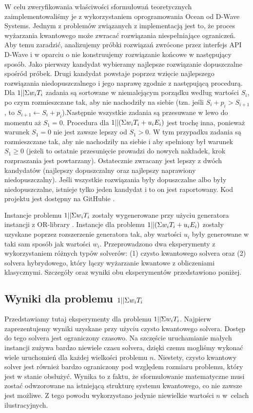 W celu zweryfikowania właściwości sformułowań teoretycznych zaimplementowaliśmy je z wykorzystaniem oprogramowania Ocean od D-Wave Systems. Jednym z problemów związanych z implementacją jest to, że proces wyżarzania kwantowego może zwracać rozwiązania niespełniające ograniczeń.
Aby temu zaradzić, analizujemy próbki rozwiązań zwrócone przez interfejs API D-Wave i w oparciu o nie konstruujemy rozwiązanie końcowe w następujący sposób. Jako pierwszy kandydat wybieramy najlepsze rozwiązanie dopuszczalne spośród próbek. Drugi kandydat powstaje poprzez wzięcie najlepszego rozwiązania niedopuszczalnego i jego naprawę zgodnie z następującą procedurą.
Dla $1||\Sigma{}w_i T_i$ zadania są sortowane w niemalejącym porządku według wartości $S_i$, po czym rozmieszczane tak, aby nie nachodziły na siebie (tzn. jeśli $S_i + p_i > S_{i+1}$, to $S_{i+1} \leftarrow S_i + p_i$).Następnie wszystkie zadania są przesuwane w lewo do momentu aż $S_1 = 0$.
Procedura dla $1||(\Sigma{}w_i T_i+u_i E_i)$ jest trochę inna, ponieważ warunek $S_1 = 0$ nie jest zawsze lepszy od $S_1 > 0$.
W tym przypadku zadania są rozmieszczane tak, aby nie nachodziły na siebie i aby spełniony był warunek $S_1 \ge 0$ (jeżeli to ostatnie przesunięcie prowadzi do nowych nakładek, krok rozpraszania jest powtarzany).
 Ostatecznie zwracany jest lepszy z dwóch kandydatów (najlepszy dopuszczalny oraz najlepszy naprawiony niedopuszczalny). Jeśli wszystkie rozwiązania były dopuszczalne albo były niedopuszczalne, istnieje tylko jeden kandydat i to on jest raportowany. Kod projektu jest dostępny na GitHubie \cite{github}.
 
Instancje problemu $1||\Sigma{}w_i T_i$ zostały wygenerowane przy użyciu generatora instancji z OR-library \cite{Beasley01111990}. Instancje dla problemu $1||(\Sigma{}w_i T_i+u_i E_i)$ zostały uzyskane poprzez rozszerzenie generatora tak, aby wartości $u_i$ były generowane w taki sam sposób jak wartości $w_i$. 
Przeprowadzono dwa eksperymenty z wykorzystaniem różnych typów solverów: (1) czysto kwantowego solvera oraz (2) solvera hybrydowego, który łączy wyżarzanie kwantowe z obliczeniami klasycznymi. Szczegóły oraz wyniki obu eksperymentów przedstawiono poniżej.


\subsection{Wyniki dla problemu $1||\Sigma{}w_i T_i$}\label{subsec:wiTi}
Przedstawiamy tutaj eksperymenty dla problemu $1||\Sigma{}w_i T_i$. Najpierw zaprezentujemy wyniki uzyskane przy użyciu czysto kwantowego solvera. Dostęp do tego solvera jest ograniczony czasowo. Na szczęście uruchamianie małych instancji zużywa bardzo niewiele czasu solvera, dzięki czemu mogliśmy wykonać wiele uruchomień dla każdej wielkości problemu $n$. Niestety, czysto kwantowy solver jest również bardzo ograniczony pod względem rozmiaru problemu, który jest w stanie obsłużyć. Wynika to z faktu, że sformułowanie matematyczne musi zostać odwzorowane na istniejącą strukturę systemu kwantowego, co nie zawsze jest możliwe. Z tego powodu wykorzystano jedynie niewielkie wartości $n$ w~celach ilustracyjnych.


